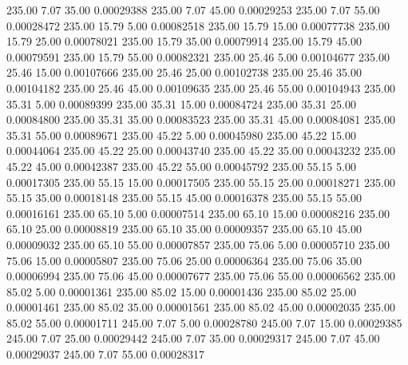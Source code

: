     235.00      7.07     35.00     0.00029388
    235.00      7.07     45.00     0.00029253
    235.00      7.07     55.00     0.00028472
    235.00     15.79      5.00     0.00082518
    235.00     15.79     15.00     0.00077738
    235.00     15.79     25.00     0.00078021
    235.00     15.79     35.00     0.00079914
    235.00     15.79     45.00     0.00079591
    235.00     15.79     55.00     0.00082321
    235.00     25.46      5.00     0.00104677
    235.00     25.46     15.00     0.00107666
    235.00     25.46     25.00     0.00102738
    235.00     25.46     35.00     0.00104182
    235.00     25.46     45.00     0.00109635
    235.00     25.46     55.00     0.00104943
    235.00     35.31      5.00     0.00089399
    235.00     35.31     15.00     0.00084724
    235.00     35.31     25.00     0.00084800
    235.00     35.31     35.00     0.00083523
    235.00     35.31     45.00     0.00084081
    235.00     35.31     55.00     0.00089671
    235.00     45.22      5.00     0.00045980
    235.00     45.22     15.00     0.00044064
    235.00     45.22     25.00     0.00043740
    235.00     45.22     35.00     0.00043232
    235.00     45.22     45.00     0.00042387
    235.00     45.22     55.00     0.00045792
    235.00     55.15      5.00     0.00017305
    235.00     55.15     15.00     0.00017505
    235.00     55.15     25.00     0.00018271
    235.00     55.15     35.00     0.00018148
    235.00     55.15     45.00     0.00016378
    235.00     55.15     55.00     0.00016161
    235.00     65.10      5.00     0.00007514
    235.00     65.10     15.00     0.00008216
    235.00     65.10     25.00     0.00008819
    235.00     65.10     35.00     0.00009357
    235.00     65.10     45.00     0.00009032
    235.00     65.10     55.00     0.00007857
    235.00     75.06      5.00     0.00005710
    235.00     75.06     15.00     0.00005807
    235.00     75.06     25.00     0.00006364
    235.00     75.06     35.00     0.00006994
    235.00     75.06     45.00     0.00007677
    235.00     75.06     55.00     0.00006562
    235.00     85.02      5.00     0.00001361
    235.00     85.02     15.00     0.00001436
    235.00     85.02     25.00     0.00001461
    235.00     85.02     35.00     0.00001561
    235.00     85.02     45.00     0.00002035
    235.00     85.02     55.00     0.00001711
    245.00      7.07      5.00     0.00028780
    245.00      7.07     15.00     0.00029385
    245.00      7.07     25.00     0.00029442
    245.00      7.07     35.00     0.00029317
    245.00      7.07     45.00     0.00029037
    245.00      7.07     55.00     0.00028317
